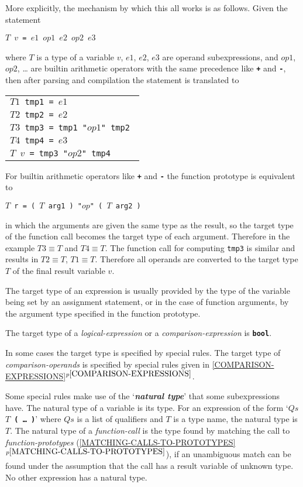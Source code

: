 \documentclass[12pt]{article}
\newcommand{\TT}[1]{{\tt \bfseries #1}}
\newcommand{\key}[1]{{\bf \em #1}\index{#1}}
\newcommand{\itemref}[1]{\ref{#1}$^{p\pageref{#1}}$}
\begin{document}
More explicitly, the mechanism by which this all works is as
follows.  Given the statement
\begin{center}
\tt $T$ $v$ = $e1$ $op1$ $e2$ $op2$ $e3$
\end{center}
where $T$ is a type of a variable $v$, $e1$, $e2$, $e3$ are
operand subexpressions, and $op1$, $op2$, \ldots{} are builtin arithmetic
operators with the
same precedence like \TT{+} and \TT{-}, then
after parsing and compilation the statement is translated to
\begin{center}
\begin{tabular}{l}
\tt $T1$ tmp1 = $e1$ \\
\tt $T2$ tmp2 = $e2$ \\
\tt $T3$ tmp3 = tmp1 "$op1$" tmp2 \\
\tt $T4$ tmp4 = $e3$ \\
\tt $T$ $v$ = tmp3 "$op2$" tmp4 \\
\end{tabular}
\end{center}
For builtin arithmetic operators like \TT{+} and \TT{-} the function
prototype is equivalent to
\begin{center}
\tt $T$ r = ( $T$ arg1 ) "$op$" ( $T$ arg2 )
\end{center}
in which the arguments are given the same type as the result,
so the target type of the function call becomes the target type
of each argument.  Therefore in the example $T3\equiv T$ and
$T4\equiv T$.  The function call for computing {\tt tmp3} is
similar and results in $T2\equiv T$, $T1\equiv T$.  Therefore
all operands are converted to the target type $T$ of the final
result variable $v$.

The target type of an expression is usually provided by the
type of the variable being set by an assignment statement, or in the
case of function arguments, by the argument type specified in the
function prototype.

The target type of a {\em logical-expression} or a {\em comparison-expression}
is \TT{bool}.

In some cases the target type is specified by special rules.  The
target type of {\em comparison-operands} is specified by special
rules given in \itemref{COMPARISON-EXPRESSIONS}.

Some special rules
make use of the `\key{natural type}'\label{NATURAL-TYPE}
that some subexpressions have.
The natural type of a variable is its type.
For an expression of the form `\TT{$Qs$ $T$ ( \ldots{} )}'
where $Qs$ is a list of qualifiers and $T$ is a type name, the
natural type is $T$.
The natural type of a {\em function-call} is the type found by matching
the call to {\em function-prototypes}
(\itemref{MATCHING-CALLS-TO-PROTOTYPES}), if an unambiguous
match can be found under the assumption that
the call has a result variable of unknown type.
No other expression has a natural type.
\end{document}

